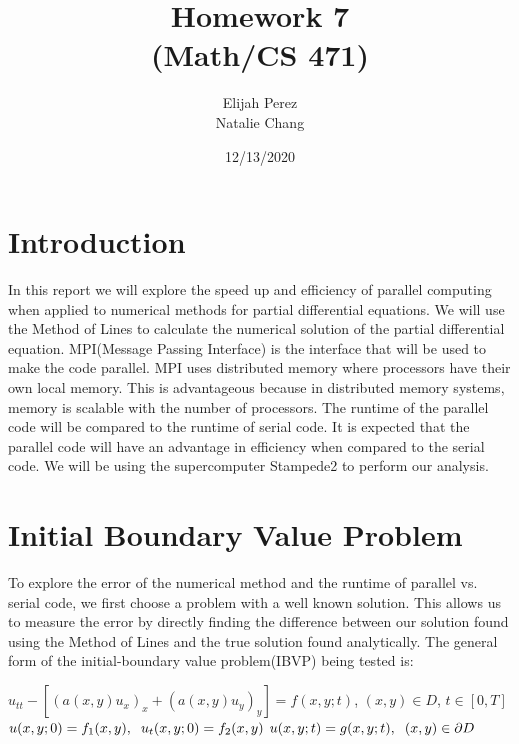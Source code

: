 \documentclass[12pt]{article}
\title{Homework 7 \protect \\(Math/CS 471)}
\author{Elijah Perez \protect \newline \\ Natalie Chang}
\date{\vfill 12/13/2020}
\begin{document}
	\maketitle
	\pagebreak
	
	\section{Introduction}
     In this report we will explore the speed up and efficiency of parallel computing when applied to numerical methods for partial differential equations. We will use the Method of Lines to calculate the numerical solution of the partial differential equation. MPI(Message Passing Interface) is the interface that will be used to make the code parallel. MPI uses distributed memory where processors have their own local memory. This is advantageous because in distributed memory systems, memory is scalable with the number of processors. The runtime of the parallel code will be compared to the runtime of serial code. It is expected that the parallel code will have an advantage in efficiency when compared to the serial code. We will be using the supercomputer Stampede2 to perform our analysis.  
	
	\section{Initial Boundary Value Problem}
	To explore the error of the numerical method and the runtime of parallel vs. serial code, we first choose a problem with a well known solution. This allows us to measure the error by directly finding the difference between our solution found using the Method of Lines and the true solution found analytically.
	\newline \newline
	The general form of the initial-boundary value problem(IBVP) being tested is:
	\newline
	\begin{center}
		$u_{tt}-[(a(x,y)u_x)_x+(a(x,y)u_y)_y]=f(x,y;t)$,\hspace{2mm} $(x,y)\in D$, \hspace{2mm}$t\in [0,T]$ \newline 
		 $u(x,y;0)=f_1(x,y), \hspace{2mm} u_t(x,y;0)=f_2(x,y)$ \newline
		$u(x,y;t)=g(x,y;t), \hspace{2mm} (x,y)\in \partial D$
	\end{center}
	
\end{document}
